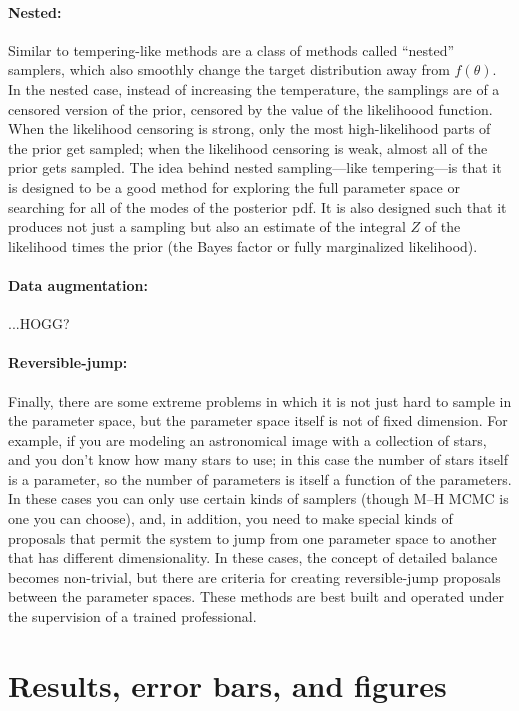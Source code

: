 \documentclass[12pt,twoside,pdftex]{article}
\newcommand{\pars}{\theta}
\begin{document}
\paragraph{Nested:}
Similar to tempering-like methods are a class of methods called ``nested''
samplers, which also smoothly change the target distribution away from $f(\pars)$.
In the nested case, instead of increasing the temperature, the
samplings are of a censored version of the prior, censored by the
value of the likelihoood function.
When the likelihood censoring is strong, only the most high-likelihood
parts of the prior get sampled; when the likelihood censoring is weak,
almost all of the prior gets sampled.
The idea behind nested sampling---like tempering---is that it is
designed to be a good method for exploring the full parameter space or
searching for all of the modes of the posterior pdf.
It is also designed such that it produces not just a sampling but also
an estimate of the integral $Z$ of the likelihood times the prior
(the Bayes factor or fully marginalized likelihood).

\paragraph{Data augmentation:}
...HOGG?

\paragraph{Reversible-jump:}
Finally, there are some extreme problems in which it is not just hard
to sample in the parameter space, but the parameter space itself is
not of fixed dimension.
For example, if you are modeling an astronomical image with a
collection of stars, and you don't know how many stars to use; in this
case the number of stars itself is a parameter, so the number of
parameters is itself a function of the parameters.
In these cases you can only use certain kinds of samplers (though M--H
MCMC is one you can choose), and, in addition, you need to make
special kinds of proposals that permit the system to jump from one
parameter space to another that has different dimensionality.
In these cases, the concept of detailed balance becomes non-trivial,
but there are criteria for creating reversible-jump proposals between
the parameter spaces.
These methods are best built and operated under the supervision of a
trained professional.

\section{Results, error bars, and figures}
\end{document}
